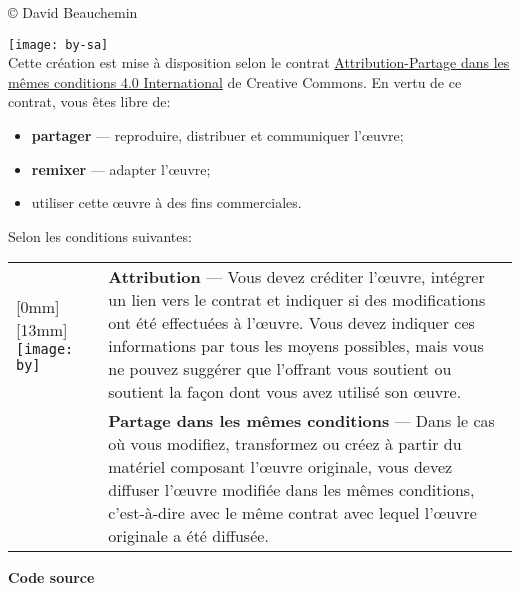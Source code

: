 \small
{\copyright} {\the\year} David Beauchemin \\

\vspace{\baselineskip}

\texttt{[image: by-sa]}\\%
Cette création est mise à disposition selon le contrat
\href{http://creativecommons.org/licenses/by-sa/4.0/deed.fr}{%
  Attribution-Partage dans les mêmes conditions 4.0 International} de
Creative Commons. En vertu de ce contrat, vous êtes libre de:
\begin{itemize}
\item \textbf{partager} --- reproduire, distribuer et communiquer
  l'{\oe}uvre;
\item \textbf{remixer} --- adapter l'{\oe}uvre;
\item utiliser cette {\oe}uvre à des fins commerciales.
\end{itemize}
Selon les conditions suivantes:

\begin{tabularx}{\linewidth}{@{}lX@{}}
  \raisebox{-9mm}[0mm][13mm]{%
    \texttt{[image: by]}} &
  \textbf{Attribution} --- Vous devez créditer l'{\oe}uvre, intégrer
  un lien vers le contrat et indiquer si des modifications ont été
  effectuées à l'{\oe}uvre. Vous devez indiquer ces informations par
  tous les moyens possibles, mais vous ne pouvez suggérer que
  l'offrant vous soutient ou soutient la façon dont vous avez utilisé
  son {\oe}uvre. \\
  \raisebox{-9mm}{\texttt{[image: sa]}}
  & \textbf{Partage dans les mêmes conditions} --- Dans le cas où vous
  modifiez, transformez ou créez à partir du matériel composant
  l'{\oe}uvre originale, vous devez diffuser l'{\oe}uvre modifiée dans
  les mêmes conditions, c'est-à-dire avec le même contrat avec lequel
  l'{\oe}uvre originale a été diffusée.
\end{tabularx}

\bigskip
  \textbf{Code source} \\
  \viewsource{\ghurl}